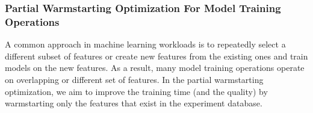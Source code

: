 \subsubsection{Partial Warmstarting Optimization For Model Training Operations}
A common approach in machine learning workloads is to repeatedly select a different subset of features or create new features from the existing ones and train models on the new features.
As a result, many model training operations operate on overlapping or different set of features.
In the partial warmstarting optimization, we aim to improve the training time (and the quality) by warmstarting only the features that exist in the experiment database.

%
%


